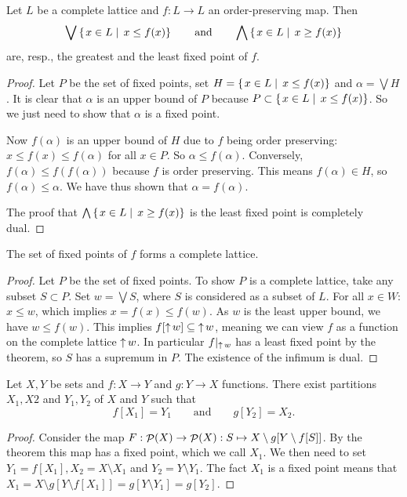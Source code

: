 \begin{theorem}
Let $L$ be a complete lattice and $f:L\to L$ an order-preserving map. Then 
\[ \bigvee \left\{\left. x\in L \;\right|\; x\leq f(x) \right\} \qquad\text{and}\qquad \bigwedge \left\{\left. x\in L \;\right|\; x\geq f(x) \right\} \]
are, resp., the greatest and the least fixed point of $f$.
\end{theorem}
\begin{proof}
Let $P$ be the set of fixed points, set $H = \left\{\left. x\in L \;\right|\; x\leq f(x) \right\}$ and $\alpha = \bigvee H$. It is clear that $\alpha$ is an upper bound of $P$ because $P \subset  \left\{\left. x\in L \;\right|\; x\leq f(x) \right\}$. So we just need to show that $\alpha$ is a fixed point.

Now $f(\alpha)$ is an upper bound of $H$ due to $f$ being order preserving: $x \leq f(x) \leq  f(\alpha)$ for all $x\in P$. So $\alpha \leq f(\alpha)$.
Conversely, $f(\alpha) \leq f(f(\alpha))$ because $f$ is order preserving. This means $f(\alpha)\in H$, so $f(\alpha)\leq \alpha$. We have thus shown that $\alpha = f(\alpha)$.

The proof that $\bigwedge \left\{\left. x\in L \;\right|\; x\geq f(x) \right\}$ is the least fixed point is completely dual.
\end{proof}
\begin{corollary}
The set of fixed points of $f$ forms a complete lattice.
\end{corollary}
\begin{proof}
Let $P$ be the set of fixed points. To show $P$ is a complete lattice, take any subset $S\subset P$.
Set $w = \bigvee S$, where $S$ is considered as a subset of $L$. For all $x\in W$: $x\leq w$, which implies $x=f(x)\leq f(w)$. As $w$ is the least upper bound, we have $w\leq f(w)$. This implies $f[\mathop{\uparrow} w]\subseteq \mathop{\uparrow} w$, meaning we can view $f$ as a function on the complete lattice $\mathop{\uparrow} w$. In particular $f|_{\mathop{\uparrow} w}$ has a least fixed point by the theorem, so $S$ has a supremum in $P$. The existence of the infimum is dual.
\end{proof}
\begin{corollary}
Let $X,Y$ be sets and $f:X\to Y$ and $g:Y\to X$ functions. There exist partitions $X_1,X2$ and $Y_1,Y_2$ of $X$ and $Y$ such that
\[ f[X_1] = Y_1 \qquad\text{and}\qquad g[Y_2] = X_2. \]
\end{corollary}
\begin{proof}
Consider the map $F: \mathop{\mathcal{P}}(X)\to\mathop{\mathcal{P}}(X): S\mapsto X\setminus g[Y\setminus f[S]]$. By the theorem this map has a fixed point, which we call $X_1$. We then need to set $Y_1 = f[X_1], X_2 = X\setminus X_1$ and $Y_2 = Y\setminus Y_1$. The fact $X_1$ is a fixed point means that $X_1 = X\setminus g[Y\setminus f[X_1]] = g[Y\setminus Y_1] = g[Y_2]$.
\end{proof}
